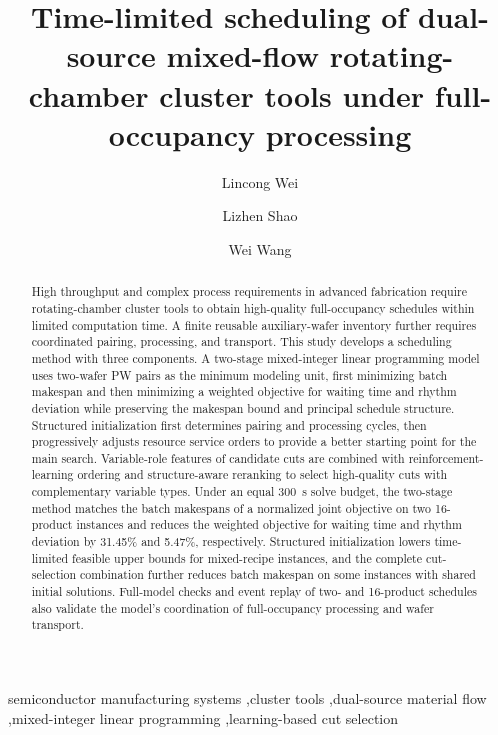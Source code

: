 \documentclass[final,5p,times,twocolumn]{elsarticle}
\begin{document}
\raggedbottom
\begin{frontmatter}

\title{Time-limited scheduling of dual-source mixed-flow rotating-chamber cluster tools under full-occupancy processing}
\author[ustb]{Lincong Wei}
\author[ustb]{Lizhen Shao}
\author[ustb]{Wei Wang}
\address[ustb]{Department of Control Science and Engineering, University of Science and Technology Beijing, No. 30 Xueyuan Road, Haidian District, Beijing 100083, China}

\begin{abstract}
High throughput and complex process requirements in advanced fabrication require rotating-chamber cluster tools to obtain high-quality full-occupancy schedules within limited computation time. A finite reusable auxiliary-wafer inventory further requires coordinated pairing, processing, and transport. This study develops a scheduling method with three components. A two-stage mixed-integer linear programming model uses two-wafer PW pairs as the minimum modeling unit, first minimizing batch makespan and then minimizing a weighted objective for waiting time and rhythm deviation while preserving the makespan bound and principal schedule structure. Structured initialization first determines pairing and processing cycles, then progressively adjusts resource service orders to provide a better starting point for the main search. Variable-role features of candidate cuts are combined with reinforcement-learning ordering and structure-aware reranking to select high-quality cuts with complementary variable types. Under an equal 300~s solve budget, the two-stage method matches the batch makespans of a normalized joint objective on two 16-product instances and reduces the weighted objective for waiting time and rhythm deviation by 31.45\% and 5.47\%, respectively. Structured initialization lowers time-limited feasible upper bounds for mixed-recipe instances, and the complete cut-selection combination further reduces batch makespan on some instances with shared initial solutions. Full-model checks and event replay of two- and 16-product schedules also validate the model's coordination of full-occupancy processing and wafer transport.

\end{abstract}
\begin{keyword}
semiconductor manufacturing systems \sep cluster tools \sep dual-source material flow \sep mixed-integer linear programming \sep learning-based cut selection
\end{keyword}
\end{frontmatter}
\end{document}
